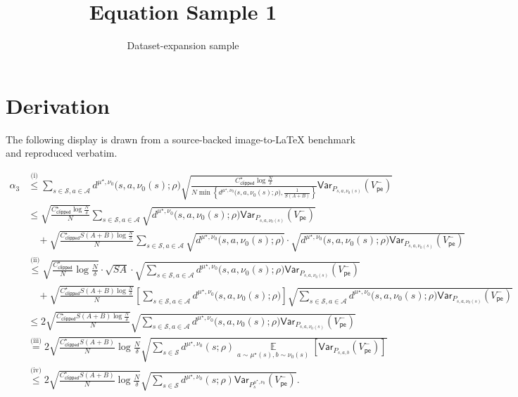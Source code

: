 \documentclass[11pt]{article}
\title{Equation Sample 1}
\author{Dataset-expansion sample}
\date{}
\begin{document}
\maketitle
\section{Derivation}
The following display is drawn from a source-backed image-to-LaTeX benchmark and reproduced verbatim.

\begin{align*}
\alpha_{3} & \overset{\text{(i)}}{\leq}\sum_{s\in\mathcal{S},a\in\mathcal{A}}d^{\mu^{\star},\nu_{0}}\big(s,a,\nu_{0}(s);\rho\big)\sqrt{\frac{C_{\mathsf{clipped}}^{\star}\log\frac{N}{\delta}}{N\min\left\{ d^{\mu^{\star},\nu_{0}}\big(s,a,\nu_{0}(s);\rho\big),\frac{1}{S\left(A+B\right)}\right\} }\mathsf{Var}_{P_{s,a,\nu_{0}(s)}}\left(V_{\mathsf{pe}}^{-}\right)}\nonumber \\
& \leq\sqrt{\frac{C_{\mathsf{clipped}}^{\star}\log\frac{N}{\delta}}{N}}\sum_{s\in\mathcal{S},a\in\mathcal{A}}\sqrt{d^{\mu^{\star},\nu_{0}}\big(s,a,\nu_{0}(s);\rho\big)\mathsf{Var}_{P_{s,a,\nu_{0}(s)}}\left(V_{\mathsf{pe}}^{-}\right)}\nonumber \\
& \quad+\sqrt{\frac{C_{\mathsf{clipped}}^{\star}S\left(A+B\right)\log\frac{N}{\delta}}{N}}\sum_{s\in\mathcal{S},a\in\mathcal{A}}\sqrt{d^{\mu^{\star},\nu_{0}}\big(s,a,\nu_{0}(s);\rho\big)}\cdot\sqrt{d^{\mu^{\star},\nu_{0}}\big(s,a,\nu_{0}(s);\rho\big)\mathsf{Var}_{P_{s,a,\nu_{0}(s)}}\left(V_{\mathsf{pe}}^{-}\right)}\nonumber \\
& \overset{\text{(ii)}}{\leq}\sqrt{\frac{C_{\mathsf{clipped}}^{\star}}{N}\log\frac{N}{\delta}}\cdot\sqrt{SA}\cdot\sqrt{\sum_{s\in\mathcal{S},a\in\mathcal{A}}d^{\mu^{\star},\nu_{0}}\big(s,a,\nu_{0}(s);\rho\big)\mathsf{Var}_{P_{s,a,\nu_{0}(s)}}\left(V_{\mathsf{pe}}^{-}\right)}\nonumber \\
& \quad+\sqrt{\frac{C_{\mathsf{clipped}}^{\star}S\left(A+B\right)\log\frac{N}{\delta}}{N}}\left[\sum_{s\in\mathcal{S},a\in\mathcal{A}}d^{\mu^{\star},\nu_{0}}\big(s,a,\nu_{0}(s);\rho\big)\right]\sqrt{\sum_{s\in\mathcal{S},a\in\mathcal{A}}d^{\mu^{\star},\nu_{0}}\big(s,a,\nu_{0}(s);\rho\big)\mathsf{Var}_{P_{s,a,\nu_{0}(s)}}\left(V_{\mathsf{pe}}^{-}\right)}\nonumber \\
& \leq2\sqrt{\frac{C_{\mathsf{clipped}}^{\star}S\left(A+B\right)\log\frac{N}{\delta}}{N}}\sqrt{\sum_{s\in\mathcal{S},a\in\mathcal{A}}d^{\mu^{\star},\nu_{0}}\big(s,a,\nu_{0}(s);\rho\big)\mathsf{Var}_{P_{s,a,\nu_{0}(s)}}\left(V_{\mathsf{pe}}^{-}\right)}\nonumber \\
& \overset{\text{(iii)}}{=}2\sqrt{\frac{C_{\mathsf{clipped}}^{\star}S\left(A+B\right)}{N}\log\frac{N}{\delta}}\sqrt{\sum_{s\in\mathcal{S}}d^{\mu^{\star},\nu_{0}}\left(s;\rho\right)\mathop{\mathbb{E}}\limits _{a\sim\mu^{\star}(s),b\sim\nu_{0}(s)}\left[\mathsf{Var}_{P_{s,a,b}}\left(V_{\mathsf{pe}}^{-}\right)\right]}\nonumber \\
& \overset{\text{(iv)}}{\leq}2\sqrt{\frac{C_{\mathsf{clipped}}^{\star}S\left(A+B\right)}{N}\log\frac{N}{\delta}}\sqrt{\sum_{s\in\mathcal{S}}d^{\mu^{\star},\nu_{0}}\left(s;\rho\right)\mathsf{Var}_{P_{s}^{\mu^{\star},\nu_{0}}}\left(V_{\mathsf{pe}}^{-}\right)}.\end{align*}
\end{document}
